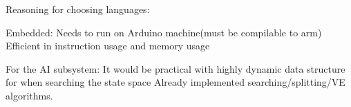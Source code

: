 Reasoning for choosing languages:

Embedded:
  Needs to run on Arduino machine(must be compilable to arm)
  Efficient in instruction usage and memory usage

For the AI subsystem:
  It would be practical with highly dynamic data structure for when searching the state space
  Already implemented searching/splitting/VE algorithms.
